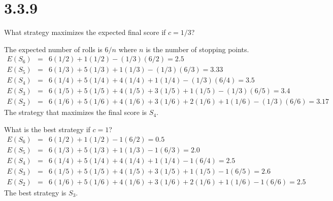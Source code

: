 \section*{3.3.9}
What strategy maximizes the expected final score if $c=1/3$?

\bigskip
\noindent
The expected number of rolls is $6/n$ where $n$ is the number of
stopping points.
\begin{eqnarray*}
E(S_6)&=&6(1/2)+1(1/2)-(1/3)(6/2)=2.5
\\
E(S_5)&=&6(1/3)+5(1/3)+1(1/3)-(1/3)(6/3)=3.33
\\
E(S_4)&=&6(1/4)+5(1/4)+4(1/4)+1(1/4)-(1/3)(6/4)=3.5
\\
E(S_3)&=&6(1/5)+5(1/5)+4(1/5)+3(1/5)+1(1/5)-(1/3)(6/5)=3.4
\\
E(S_2)&=&6(1/6)+5(1/6)+4(1/6)+3(1/6)+2(1/6)+1(1/6)-(1/3)(6/6)=3.17
\end{eqnarray*}
The strategy that maximizes the final score is $S_4$.

\bigskip
\noindent
What is the best strategy if $c=1$?
\begin{eqnarray*}
E(S_6)&=&6(1/2)+1(1/2)-1(6/2)=0.5
\\
E(S_5)&=&6(1/3)+5(1/3)+1(1/3)-1(6/3)=2.0
\\
E(S_4)&=&6(1/4)+5(1/4)+4(1/4)+1(1/4)-1(6/4)=2.5
\\
E(S_3)&=&6(1/5)+5(1/5)+4(1/5)+3(1/5)+1(1/5)-1(6/5)=2.6
\\
E(S_2)&=&6(1/6)+5(1/6)+4(1/6)+3(1/6)+2(1/6)+1(1/6)-1(6/6)=2.5
\end{eqnarray*}
The best strategy is $S_3$.
